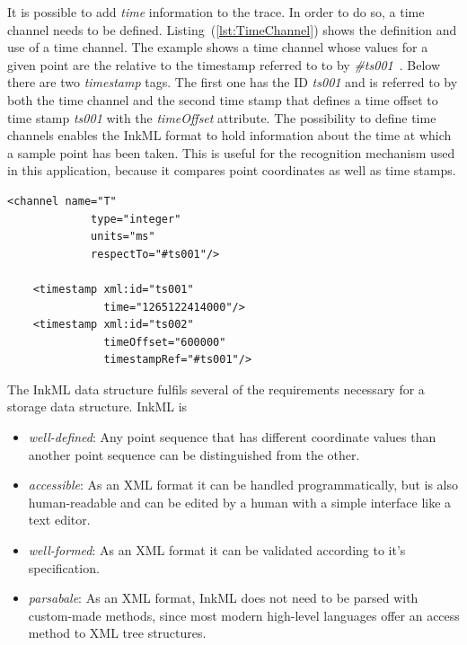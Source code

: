 It is possible to add \emph{time} information to the trace. In order to do so,
a time channel needs to be defined. Listing~(\ref{lst:TimeChannel}) shows the 
definition and use of a time channel. The example shows a time channel whose 
values for a given point are the relative to the timestamp referred to to by 
\emph{\#ts001}~. Below there are two \emph{timestamp} tags.
The first one has the ID \emph{ts001} and is referred to by both the
time channel and the second time stamp that defines a time offset to time stamp
\emph{ts001} with the \emph{timeOffset} attribute.
The possibility to define time channels enables the InkML format to hold 
information about the time at which a sample point has been taken.
This is useful for the recognition mechanism used in this application,
because it compares point coordinates as well as time stamps.
\begin{xmlcode}
  \begin{lstlisting}[emph={timestamp,channel},
                     emphstyle=\color{blue}\textbf,
                     emph={[2]name,type,units,respectTo,time,
                              timeOffset,timestampRef},
                     emphstyle={[2]\color{red}},
                     caption={Demonstration of the \emph{time channel}},
                     label=lst:TimeChannel]
    <channel name="T" 
             type="integer"
             units="ms"
             respectTo="#ts001"/>

    <timestamp xml:id="ts001" 
               time="1265122414000"/>
    <timestamp xml:id="ts002" 
               timeOffset="600000" 
               timestampRef="#ts001"/>
  \end{lstlisting}
\end{xmlcode}
The InkML data structure fulfils several of the requirements necessary for a 
storage data structure. InkML is 
\begin{itemize}
  \item \emph{well-defined}: Any point sequence that has different coordinate
        values than another point sequence can be distinguished from the other.
        
  \item \emph{accessible}: As an XML format it can be handled programmatically,
        but is also human-readable and can be edited by a human with a simple
        interface like a text editor.

  \item \emph{well-formed}: As an XML format it can be validated according to 
        it's specification.

  \item \emph{parsabale}: As an XML format, InkML does not need to be parsed with
        custom-made methods, since most modern high-level languages offer
        an access method to XML tree structures.
\end{itemize}

